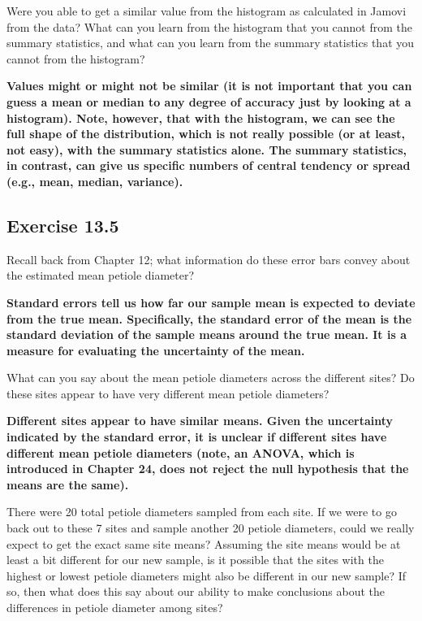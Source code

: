 \documentclass[
]{scrbook}
\begin{document}
Were you able to get a similar value from the histogram as calculated in Jamovi from the data? What can you learn from the histogram that you cannot from the summary statistics, and what can you learn from the summary statistics that you cannot from the histogram?

\textbf{Values might or might not be similar (it is not important that you can guess a mean or median to any degree of accuracy just by looking at a histogram). Note, however, that with the histogram, we can see the full shape of the distribution, which is not really possible (or at least, not easy), with the summary statistics alone. The summary statistics, in contrast, can give us specific numbers of central tendency or spread (e.g., mean, median, variance).}

\hypertarget{exercise-13.5}{%
\subsection{Exercise 13.5}\label{exercise-13.5}}

Recall back from Chapter 12; what information do these error bars convey about the estimated mean petiole diameter?

\textbf{Standard errors tell us how far our sample mean is expected to deviate from the true mean. Specifically, the standard error of the mean is the standard deviation of the sample means around the true mean. It is a measure for evaluating the uncertainty of the mean.}

What can you say about the mean petiole diameters across the different sites? Do these sites appear to have very different mean petiole diameters?

\textbf{Different sites appear to have similar means. Given the uncertainty indicated by the standard error, it is unclear if different sites have different mean petiole diameters (note, an ANOVA, which is introduced in Chapter 24, does not reject the null hypothesis that the means are the same).}

There were 20 total petiole diameters sampled from each site. If we were to go back out to these 7 sites and sample another 20 petiole diameters, could we really expect to get the exact same site means? Assuming the site means would be at least a bit different for our new sample, is it possible that the sites with the highest or lowest petiole diameters might also be different in our new sample? If so, then what does this say about our ability to make conclusions about the differences in petiole diameter among sites?
\end{document}
